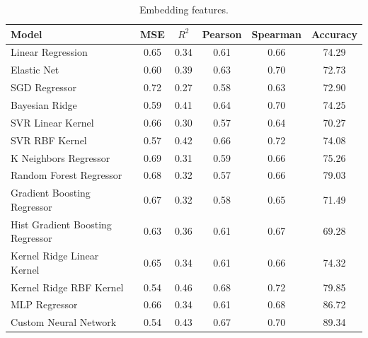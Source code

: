 \begin{table}[ht]
    \begin{subtable}[t]{\textwidth}
        \centering
        \begin{tabular}{|l|c|c|c|c|c|}
            \hline
            Model & MSE & $R^2$ & Pearson & Spearman & Accuracy \\
            \hline
            Linear Regression                & 0.65 & 0.34 & 0.61 & 0.66 & 74.29 \\
            Elastic Net                      & 0.60 & 0.39 & 0.63 & 0.70 & 72.73 \\
            SGD Regressor                    & 0.72 & 0.27 & 0.58 & 0.63 & 72.90 \\
            Bayesian Ridge                   & 0.59 & 0.41 & 0.64 & 0.70 & 74.25 \\
            SVR Linear Kernel                & 0.66 & 0.30 & 0.57 & 0.64 & 70.27 \\
            SVR RBF Kernel                   & 0.57 & 0.42 & 0.66 & 0.72 & 74.08 \\
            K Neighbors Regressor            & 0.69 & 0.31 & 0.59 & 0.66 & 75.26 \\
            Random Forest Regressor          & 0.68 & 0.32 & 0.57 & 0.66 & 79.03 \\
            Gradient Boosting Regressor      & 0.67 & 0.32 & 0.58 & 0.65 & 71.49 \\
            Hist Gradient Boosting Regressor & 0.63 & 0.36 & 0.61 & 0.67 & 69.28 \\
            Kernel Ridge Linear Kernel       & 0.65 & 0.34 & 0.61 & 0.66 & 74.32 \\
            Kernel Ridge RBF Kernel          & 0.54 & 0.46 & 0.68 & 0.72 & 79.85 \\
            MLP Regressor                    & 0.66 & 0.34 & 0.61 & 0.68 & 86.72 \\
            Custom Neural Network            & 0.54 & 0.43 & 0.67 & 0.70 & 89.34 \\
            \hline
        \end{tabular}
        \caption{Embedding features.}
        \label{tab:simple_models_results_embeddings}
    \end{subtable}    


\end{table}

